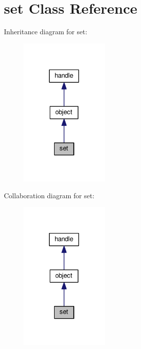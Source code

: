 \hypertarget{classset}{}\section{set Class Reference}
\label{classset}


Inheritance diagram for set\+:
\nopagebreak
\begin{figure}[H]
\begin{center}
\leavevmode
\includegraphics[width=125pt]{classset__inherit__graph}
\end{center}
\end{figure}


Collaboration diagram for set\+:
\nopagebreak
\begin{figure}[H]
\begin{center}
\leavevmode
\includegraphics[width=125pt]{classset__coll__graph}
\end{center}
\end{figure}

